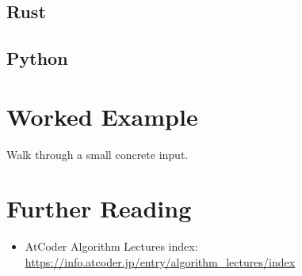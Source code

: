 \documentclass[11pt]{article}
\begin{document}
\codenote
\subsection{Rust}

\subsection{Python}

\section{Worked Example}
\begin{examplebox}
Walk through a small concrete input.
\end{examplebox}

\section{Further Reading}
\begin{itemize}[leftmargin=1.5em]
  \item AtCoder Algorithm Lectures index: \url{https://info.atcoder.jp/entry/algorithm_lectures/index}
\end{itemize}
\end{document}
